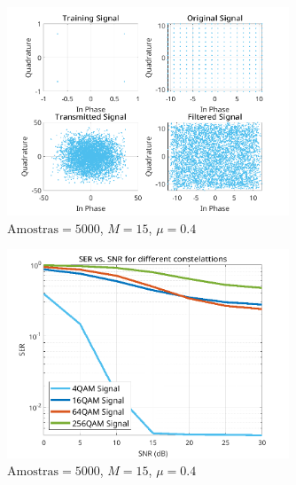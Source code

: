 \documentclass[a4paper,10pt]{article}
\begin{document}
\begin{enumerate}
				\begin{figure}[!ht]
					\centering
					\includegraphics[width=0.75\textwidth]{figs/L3Q6_C_t.png}
					\caption{$\text{Amostras} = 5000$, $M = 15$, $\mu = 0.4$}
					\label{fig:L3Q6C2}
				\end{figure}

				\begin{figure}[!ht]
					\centering
					\includegraphics[width=0.75\textwidth]{figs/L3Q6_D_ser.png}
					\caption{$\text{Amostras} = 5000$, $M = 15$, $\mu = 0.4$}
					\label{fig:L3Q6D}
				\end{figure}

		\end{enumerate}
	
\end{document}
